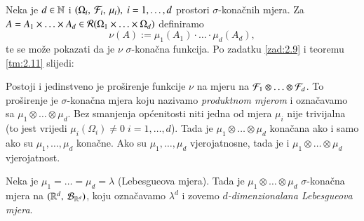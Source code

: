 Neka je $d \in \mathbb{N}$ i $(\Omega_i, \: \mathcal{F}_i, \: \mu_i), \; i = 1, \dots, d$ prostori $\sigma$-kona\v cnih mjera.
Za $A = A_1 \times \ldots \times A_d \in \mathcal{R}({\Omega_1 \times \ldots \times \Omega_d})$ definiramo
\begin{equation}    \label{jed:4.11}
    \nu (A) := \mu_1 (A_1) \cdot \ldots \cdot \mu_d (A_d),
\end{equation}
te se mo\v ze pokazati da je $\nu$ $\sigma$-kona\v cna funkcija.
Po zadatku \ref{zad:2.9} i teoremu \ref{tm:2.11} slijedi:

\begin{tm}  \label{tm:4.12}
    Postoji i jedinstveno je pro\v sirenje funkcije $\nu$ na mjeru na $\mathcal{F}_1 \otimes \ldots \otimes \mathcal{F}_d$.
    To pro\v sirenje je $\sigma$-kona\v cna mjera koju nazivamo \emph{produktnom mjerom} i ozna\v cavamo sa $\mu_1 \otimes \ldots \otimes \mu_d$.
    Bez smanjenja op\' cenitosti niti jedna od mjera $\mu_i$ nije trivijalna (to jest vrijedi $\mu_i (\Omega_i) \neq 0 \; i=1, \dots, d$).
    Tada je $\mu_1 \otimes \ldots \otimes \mu_d$ kona\v cana ako i samo ako su $\mu_1, \ldots, \mu_d$ kona\v cne.
    Ako su $\mu_1, \ldots, \mu_d$ vjerojatnosne, tada je i $\mu_1 \otimes \ldots \otimes \mu_d$ vjerojatnost. 
\end{tm}

\begin{pr}  \label{pr:4.13}
    Neka je $\mu_1 = \ldots = \mu_d = \lambda$ (Lebesgueova mjera).
    Tada je $\mu_1 \otimes \ldots \otimes \mu_d$ $\sigma$-kona\v cna mjera na $({\mathbb{R}^d}, \: {\mathcal{B}_{\mathbb{R}^d}})$, koju ozna\v cavamo $\lambda^d$ i zovemo \emph{$d$-dimenzionalana Lebesgueova mjera}.
\end{pr}


